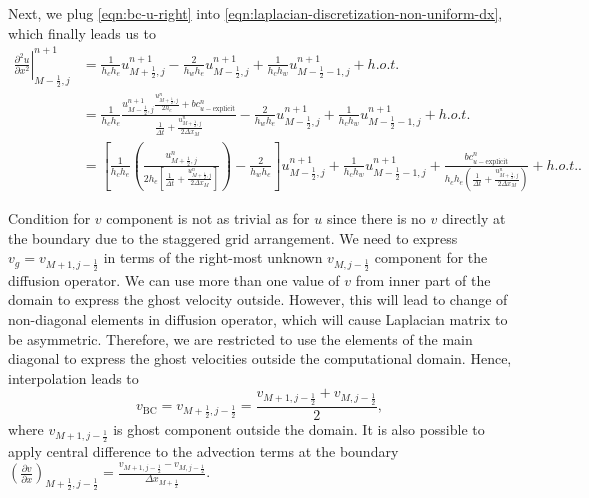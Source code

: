 \documentclass{article}
\numberwithin{equation}{section}
\begin{document}
Next, we plug \cref{eqn:bc-u-right} into \cref{eqn:laplacian-discretization-non-uniform-dx}, which finally leads us to
\begin{equation}\label{eqn:luxx-right}
\begin{aligned}
	\left.\frac{\partial ^2 u}{\partial x^2}\right|_{M-\frac{1}{2},j}^{n+1}
	&=\frac{1}{h_c h_e}u^{n+1}_{M+\frac{1}{2},j} - \frac{2}{h_w h_e}u^{n+1}_{M-\frac{1}{2},j} + \frac{1}{h_c h_w}u^{n+1}_{M-\frac{1}{2}-1,j}+h.o.t.\\
	&=\frac{1}{h_c h_e}\frac{\left.u^{n+1}_{M-\frac{1}{2},j}\frac{u^n_{M+\frac{1}{2},j}}{2h_e}+bc_{u-\text{explicit}}^n\right.}{\left.\frac{1}{\Delta t} + \frac{u^n_{M+\frac{1}{2},j}}{2\Delta x_M}\right.}- \frac{2}{h_w h_e}u^{n+1}_{M-\frac{1}{2},j} + \frac{1}{h_c h_w}u^{n+1}_{M-\frac{1}{2}-1,j}+h.o.t.\\
	&=\left[ \frac{1}{h_c h_e}\left(\frac{u^n_{M+\frac{1}{2},j}}{2h_e\left[\frac{1}{\Delta t} + \frac{u^n_{M+\frac{1}{2},j}}{2\Delta x_M}\right]} \right) -\frac{2}{h_w h_e}\right]u^{n+1}_{M-\frac{1}{2},j} + \frac{1}{h_c h_w}u^{n+1}_{M-\frac{1}{2}-1,j} + \frac{bc_{u-\text{explicit}}^n}{h_c h_e\left(\frac{1}{\Delta t} + \frac{u^n_{M+\frac{1}{2},j}}{2\Delta x_M}\right)}+h.o.t..
\end{aligned}
\end{equation}

Condition for $v$ component is not as trivial as for $u$ since there is no $v$ directly at the boundary due to the staggered grid arrangement. We need to express $v_g=v_{M+1,j-\frac{1}{2}}$ in terms of the right-most unknown $v_{M,j-\frac{1}{2}}$ component for the diffusion operator. 
We can use more than one value of $v$ from inner part of the domain to express the ghost velocity outside. However, this will lead to change of non-diagonal elements in diffusion operator, which will cause Laplacian matrix to be asymmetric. Therefore, we are restricted to use the elements of the main diagonal to express the ghost velocities outside the computational domain. Hence, interpolation leads to
\begin{equation*}
	v_{\text{BC}}=v_{M+\frac{1}{2},j-\frac{1}{2}}=\frac{v_{M+1,j-\frac{1}{2}}+v_{M,j-\frac{1}{2}}}{2},
\end{equation*}
where $v_{M+1,j-\frac{1}{2}}$ is ghost component outside the domain. It is also possible to apply central difference to the advection terms at the boundary $\left( \frac{\partial v}{\partial x}\right)_{M+\frac{1}{2},j-\frac{1}{2}}=\frac{v_{M+1,j-\frac{1}{2}}-v_{M,j-\frac{1}{2}}}{\Delta x_{M+\frac{1}{2}}}$.
\end{document}
